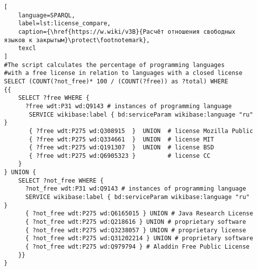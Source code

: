 \label{question:prog_lang_2}
\begin{lstlisting}[
	language=SPARQL,
	label=lst:license_compare,
	caption={\href{https://w.wiki/v3B}{Расчёт отношения свободных языков к закрытым}\protect\footnotemark},
	texcl
]
#The script calculates the percentage of programming languages 
#with a free license in relation to languages with a closed license
SELECT (COUNT(?not_free)* 100 / (COUNT(?free)) as ?total) WHERE
{{
    SELECT ?free WHERE {
      ?free wdt:P31 wd:Q9143 # instances of programming language
       SERVICE wikibase:label { bd:serviceParam wikibase:language "ru" }
       { ?free wdt:P275 wd:Q308915  }  UNION  # license Mozilla Public
       { ?free wdt:P275 wd:Q334661  }  UNION  # license MIT
       { ?free wdt:P275 wd:Q191307  }  UNION  # license BSD
       { ?free wdt:P275 wd:Q6905323 }         # license CC
    }
} UNION {
    SELECT ?not_free WHERE {
      ?not_free wdt:P31 wd:Q9143 # instances of programming language
      SERVICE wikibase:label { bd:serviceParam wikibase:language "ru" }
      { ?not_free wdt:P275 wd:Q6165015 } UNION # Java Research License
      { ?not_free wdt:P275 wd:Q218616 } UNION # proprietary software
      { ?not_free wdt:P275 wd:Q3238057 } UNION # proprietary license 
      { ?not_free wdt:P275 wd:Q31202214 } UNION # proprietary software 
      { ?not_free wdt:P275 wd:Q979794 } # Aladdin Free Public License
    }}
}
\end{lstlisting}

